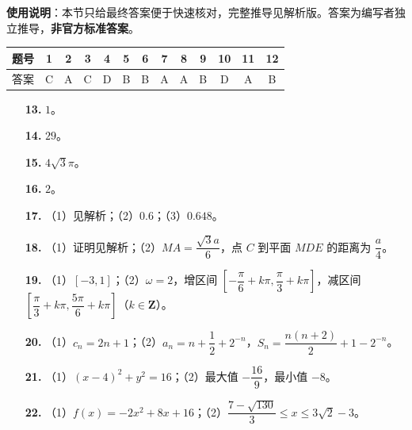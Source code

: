 
\begin{gknotice}
\textbf{使用说明}：本节只给最终答案便于快速核对，完整推导见解析版。答案为编写者独立推导，\textbf{非官方标准答案}。
\end{gknotice}

\begin{center}\begin{tabular}{ccccccccccccc}
\toprule
题号 & 1 & 2 & 3 & 4 & 5 & 6 & 7 & 8 & 9 & 10 & 11 & 12 \\
\midrule
答案 & C & A & C & D & B & B & A & A & B & D & A & B \\
\bottomrule
\end{tabular}\end{center}

\begin{itemize}[leftmargin=2.6em]
  \item[\textbf{13.}] $1$。
  \item[\textbf{14.}] $29$。
  \item[\textbf{15.}] $4\sqrt3\pi$。
  \item[\textbf{16.}] $2$。
\end{itemize}

\begin{itemize}[leftmargin=2.6em]
  \item[\textbf{17.}] （1）见解析；（2）$0.6$；（3）$0.648$。
  \item[\textbf{18.}] （1）证明见解析；（2）$MA=\dfrac{\sqrt3a}6$，点 $C$ 到平面 $MDE$ 的距离为 $\dfrac a4$。
  \item[\textbf{19.}] （1）$[-3,1]$；（2）$\omega=2$，增区间 $\left[-\dfrac{\pi}6+k\pi,\dfrac{\pi}3+k\pi\right]$，减区间 $\left[\dfrac{\pi}3+k\pi,\dfrac{5\pi}6+k\pi\right]$（$k\in\mathbf Z$）。
  \item[\textbf{20.}] （1）$c_n=2n+1$；（2）$a_n=n+\dfrac12+2^{-n}$，$S_n=\dfrac{n(n+2)}2+1-2^{-n}$。
  \item[\textbf{21.}] （1）$(x-4)^2+y^2=16$；（2）最大值 $-\dfrac{16}9$，最小值 $-8$。
  \item[\textbf{22.}] （1）$f(x)=-2x^2+8x+16$；（2）$\dfrac{7-\sqrt{130}}3\leqslant x\leqslant3\sqrt2-3$。
\end{itemize}
